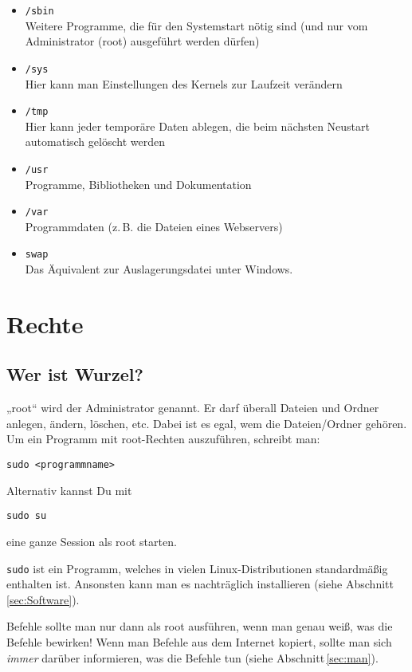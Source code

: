 \documentclass[a4paper,12pt]{article}
\begin{document}
\begin{itemize}
\item \texttt{/sbin} \\ Weitere Programme, die für den Systemstart nötig sind (und nur vom Administrator (root) ausgeführt werden dürfen)
\item \texttt{/sys} \\ Hier kann man Einstellungen des Kernels zur Laufzeit verändern
\item \texttt{/tmp} \\ Hier kann jeder temporäre Daten ablegen, die beim nächsten Neustart automatisch gelöscht werden
\item \texttt{/usr} \\ Programme, Bibliotheken und Dokumentation
\item \texttt{/var} \\ Programmdaten (z.\,B. die Dateien eines Webservers)
\item \texttt{swap} \\ Das Äquivalent zur Auslagerungsdatei unter Windows.
\end{itemize}


\section{Rechte}
\subsection{Wer ist Wurzel?}
„root“ wird der Administrator genannt. Er darf überall Dateien 
und Ordner anlegen, ändern, löschen, etc. Dabei ist es egal, wem die 
Dateien/Ordner gehören. Um ein Programm mit root-Rechten auszuführen, 
schreibt man:
\begin{lstlisting}
sudo <programmname>
\end{lstlisting} 
Alternativ kannst Du mit
\begin{lstlisting}
sudo su
\end{lstlisting} 
eine ganze Session als root starten.

\texttt{sudo} ist ein Programm, welches in vielen Linux-Distributionen standardmäßig
enthalten ist. Ansonsten kann man es nachträglich installieren (siehe Abschnitt\,\ref{sec:Software}).

Befehle sollte man nur dann als root ausführen, wenn man genau weiß, was die Befehle bewirken!
Wenn man Befehle aus dem Internet kopiert, sollte man sich \emph{immer} darüber informieren, was die Befehle tun (siehe Abschnitt\,\ref{sec:man}).
\end{document}
